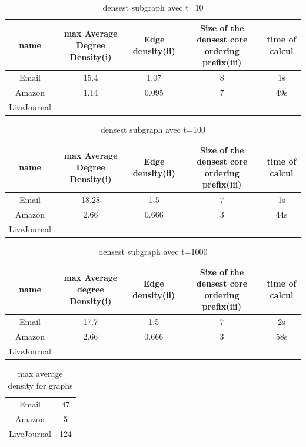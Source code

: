 \documentclass[a4paper,10pt]{report}
\begin{document}
\begin{table}[ht]
\caption{densest subgraph avec t=10}
\centering
\begin{tabular}{|c c c c c|}
\hline\hline
name & max Average Degree Density(i)&Edge density(ii)&Size of the densest core ordering prefix(iii) & time of calcul \\[0.5ex]
\hline

Email & 15.4 & 1.07 & 8 & 1s \\
Amazon & 1.14 & 0.095 & 7 & 49s \\
LiveJournal & &  &  &   \\

\hline
\end{tabular}
\label {table:nonlin}
\end{table}

\begin{table}[ht]
\caption{densest subgraph avec t=100}
\centering
\begin{tabular}{|c c c c c|}
\hline\hline
name & max Average Degree Density(i)&Edge density(ii)&Size of the densest core ordering prefix(iii) & time of calcul \\[0.5ex]
\hline

Email & 18.28 & 1.5 & 7 & 1s \\
Amazon & 2.66 & 0.666 & 3 & 44s \\
LiveJournal & &  &  &   \\

\hline
\end{tabular}
\label {table:nonlin}
\end{table}

\begin{table}[ht]
\caption{densest subgraph avec t=1000}
\centering
\begin{tabular}{|c c c c c|}
\hline\hline
name & max Average degree Density(i)&Edge density(ii)&Size of the densest core ordering prefix(iii) & time of calcul \\[0.5ex]
\hline

Email & 17.7 & 1.5 & 7 & 2s \\
Amazon & 2.66 & 0.666 & 3 & 58s \\
LiveJournal & &  &  &   \\

\hline
\end{tabular}
\label {table:nonlin}
\end{table}

\begin{table}[ht]
\caption{max average density for graphs}
\centering
\begin{tabular}{|c c |}
\hline
Email & 47 \\
Amazon & 5 \\
LiveJournal & 124  \\
\hline
\end{tabular}
\label {table:nonlin}
\end{table}
\end{document}
